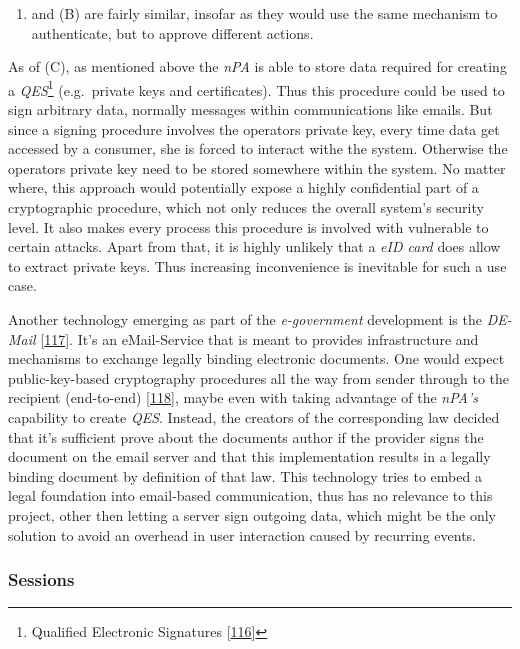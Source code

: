\documentclass[12pt,english,a4paper,titlepage,cleardoublepage=empty,dottedtoc]{report}
\providecommand{\tightlist}{%
  \setlength{\itemsep}{0pt}\setlength{\parskip}{0pt}}
\begin{document}
\begin{enumerate}
\def\labelenumi{(\Alph{enumi})}
\tightlist
\item
  and (B) are fairly similar, insofar as they would use the same
  mechanism to authenticate, but to approve different actions.
\end{enumerate}

As of (C), as mentioned above the \emph{nPA} is able to store data
required for creating a \emph{QES}\footnote{Qualified Electronic
  Signatures
  {[}\protect\hyperlink{ref-paper_2013-keymanangement-fuer-qes-mit-npa}{116}{]}}
(e.g.~private keys and certificates). Thus this procedure could be used
to sign arbitrary data, normally messages within communications like
emails. But since a signing procedure involves the operators private
key, every time data get accessed by a consumer, she is forced to
interact withe the system. Otherwise the operators private key need to
be stored somewhere within the system. No matter where, this approach
would potentially expose a highly confidential part of a cryptographic
procedure, which not only reduces the overall system's security level.
It also makes every process this procedure is involved with vulnerable
to certain attacks. Apart from that, it is highly unlikely that a
\emph{eID card} does allow to extract private keys. Thus increasing
inconvenience is inevitable for such a use case.

Another technology emerging as part of the \emph{e-government}
development is the \emph{DE-Mail}
{[}\protect\hyperlink{ref-web_2017_about-de-mail}{117}{]}. It's an
eMail-Service that is meant to provides infrastructure and mechanisms to
exchange legally binding electronic documents. One would expect
public-key-based cryptography procedures all the way from sender through
to the recipient (end-to-end)
{[}\protect\hyperlink{ref-statement_2013_de-mail}{118}{]}, maybe even
with taking advantage of the \emph{nPA's} capability to create
\emph{QES}. Instead, the creators of the corresponding law decided that
it's sufficient prove about the documents author if the provider signs
the document on the email server and that this implementation results in
a legally binding document by definition of that law. This technology
tries to embed a legal foundation into email-based communication, thus
has no relevance to this project, other then letting a server sign
outgoing data, which might be the only solution to avoid an overhead in
user interaction caused by recurring events.

\subsubsection{Sessions}\label{sessions}
\end{document}
